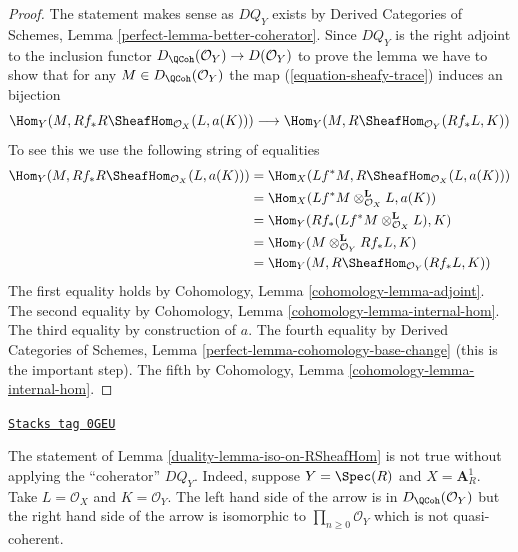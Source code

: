 \begin{proof}
The statement makes sense as $DQ_Y$ exists by
Derived Categories of Schemes, Lemma \ref{perfect-lemma-better-coherator}.
Since $DQ_Y$ is the right adjoint to the inclusion
functor $D_\QCoh(\mathcal{O}_Y) \to D(\mathcal{O}_Y)$
to prove the lemma we have to show that for any $M \in D_\QCoh(\mathcal{O}_Y)$
the map (\ref{equation-sheafy-trace}) induces an bijection
$$
\Hom_Y(M, Rf_*R\SheafHom_{\mathcal{O}_X}(L, a(K)))
\longrightarrow
\Hom_Y(M, R\SheafHom_{\mathcal{O}_Y}(Rf_*L, K))
$$
To see this we use the following string of equalities
\begin{align*}
\Hom_Y(M, Rf_*R\SheafHom_{\mathcal{O}_X}(L, a(K)))
& =
\Hom_X(Lf^*M, R\SheafHom_{\mathcal{O}_X}(L, a(K))) \\
& =
\Hom_X(Lf^*M \otimes_{\mathcal{O}_X}^\mathbf{L} L, a(K)) \\
& =
\Hom_Y(Rf_*(Lf^*M \otimes_{\mathcal{O}_X}^\mathbf{L} L), K) \\
& =
\Hom_Y(M \otimes_{\mathcal{O}_Y}^\mathbf{L} Rf_*L, K) \\
& =
\Hom_Y(M, R\SheafHom_{\mathcal{O}_Y}(Rf_*L, K))
\end{align*}
The first equality holds by Cohomology, Lemma \ref{cohomology-lemma-adjoint}.
The second equality by Cohomology, Lemma \ref{cohomology-lemma-internal-hom}.
The third equality by construction of $a$.
The fourth equality by Derived Categories of Schemes, Lemma
\ref{perfect-lemma-cohomology-base-change} (this is the important step).
The fifth by Cohomology, Lemma \ref{cohomology-lemma-internal-hom}.
\end{proof}

\begin{example}
\label{duality-example-iso-on-RSheafHom}
\href{https://stacks.math.columbia.edu/tag/0GEU}{\texttt{Stacks tag 0GEU}}

The statement of Lemma \ref{duality-lemma-iso-on-RSheafHom} is not true without
applying the ``coherator'' $DQ_Y$. Indeed, suppose $Y = \Spec(R)$ and
$X = \mathbf{A}^1_R$. Take $L = \mathcal{O}_X$ and $K = \mathcal{O}_Y$.
The left hand side of the arrow is in $D_\QCoh(\mathcal{O}_Y)$ but
the right hand side of the arrow is isomorphic to
$\prod_{n \geq 0} \mathcal{O}_Y$ which is not quasi-coherent.
\end{example}


